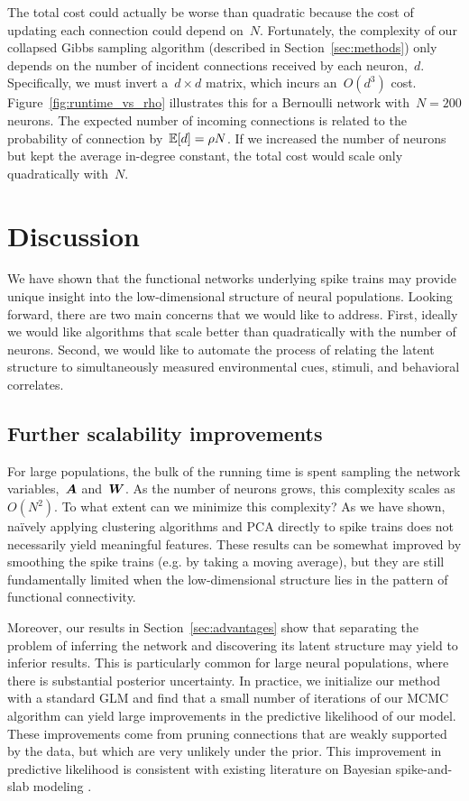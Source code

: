 The total cost could actually be worse than quadratic because the cost
of updating each connection could depend on~$N$. Fortunately, the
complexity of our collapsed Gibbs sampling algorithm (described in
Section~\ref{sec:methods}) only depends on the number of incident
connections received by each neuron,~$d$.  Specifically, we must
invert a~$d \times d$ matrix, which incurs an~$O(d^3)$
cost. Figure~\ref{fig:runtime_vs_rho} illustrates this for a Bernoulli
network with~$N=200$ neurons. The expected number of incoming
connections is related to the probability of connection
by~$\mathbb{E}[d]=\rho N$. If we increased the number of neurons but kept
the average in-degree constant, the total cost would scale only
quadratically with~$N$.



\section{Discussion}
\label{sec:discussion}
We have shown that the functional networks underlying
spike trains may provide unique insight into the low-dimensional
structure of neural populations. Looking forward, there are 
two main concerns that we would like to address.
First, ideally we would like algorithms that scale better 
than quadratically with the number of neurons. Second, we 
would like to automate the process of relating the latent 
structure to simultaneously measured environmental cues, stimuli, 
and behavioral correlates. 

\subsection{Further scalability improvements}
For large populations, the bulk of the running time is spent 
sampling the network variables,~$\boldsymbol{A}$ and~$\boldsymbol{W}$. As the number of
neurons grows, this complexity scales as~$O(N^2)$. To
what extent can we minimize this complexity? As we have shown,
na\"ively applying clustering algorithms and PCA directly
to spike trains does not necessarily yield meaningful features. These
results can be somewhat improved by smoothing the spike
trains (e.g. by taking a moving average), but they are still
fundamentally limited when the low-dimensional structure
lies in the pattern of functional connectivity.

Moreover, our results in Section~\ref{sec:advantages} show that 
separating the problem of inferring the network and discovering 
its latent structure may yield to inferior results. This is 
particularly common for large neural populations, where there is 
substantial posterior uncertainty. 
In practice, we initialize our method with a standard GLM and
find that a small number of iterations of our MCMC algorithm
can yield large improvements in the predictive likelihood of our
model. These improvements come from pruning connections that are
weakly supported by the data, but which are very unlikely under the
prior. This improvement in predictive likelihood is consistent with
existing literature on Bayesian spike-and-slab modeling \cite{Mohamed-2012}.

